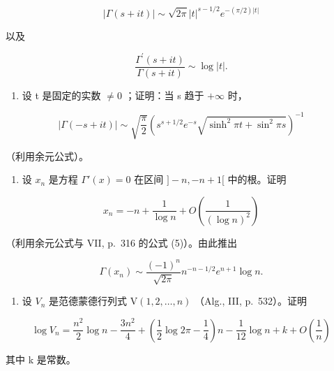 \[
| \Gamma (s + i t) | \sim \sqrt {2 \pi} | t | ^ {s - 1 / 2} e ^ {- (\pi / 2) | t |}
\]

以及

\[
\frac {\Gamma^ {\prime} (s + i t)}{\Gamma (s + i t)} \sim \log | t |.
\]

\begin{enumerate}
\def\labelenumi{\arabic{enumi})}
\setcounter{enumi}{3}
\tightlist
\item
  设 t 是固定的实数 \(\neq 0\) ；证明：当 s 趋于 \(+\infty\) 时，
\end{enumerate}

\[
| \Gamma (- s + i t) | \sim \sqrt {\frac {\pi}{2}} \left(s ^ {s + 1 / 2} e ^ {- s} \sqrt {\sinh^ {2} \pi t + \sin^ {2} \pi s}\right) ^ {- 1}
\]

（利用余元公式）。

\begin{enumerate}
\def\labelenumi{\arabic{enumi})}
\setcounter{enumi}{4}
\tightlist
\item
  设 \(x_{n}\) 是方程 \(\Gamma'(x) = 0\) 在区间 \(] - n, -n + 1[\) 中的根。证明
\end{enumerate}

\[
x _ {n} = - n + \frac {1}{\log n} + O \left(\frac {1}{(\log n) ^ {2}}\right)
\]

（利用余元公式与 VII, p.~316 的公式 (5)）。由此推出

\[
\Gamma (x _ {n}) \sim \frac {(- 1) ^ {n}}{\sqrt {2 \pi}} n ^ {- n - 1 / 2} e ^ {n + 1} \log n.
\]

\begin{enumerate}
\def\labelenumi{\arabic{enumi})}
\setcounter{enumi}{5}
\tightlist
\item
  设 \(V_{n}\) 是范德蒙德行列式 \(\mathrm{V}(1,2,\dots,n)\) （Alg., III, p.~532）。证明
\end{enumerate}

\[
\log V _ {n} = \frac {n ^ {2}}{2} \log n - \frac {3 n ^ {2}}{4} + \left(\frac {1}{2} \log 2 \pi - \frac {1}{4}\right) n - \frac {1}{12} \log n + k + O \left(\frac {1}{n}\right)
\]

其中 k 是常数。

